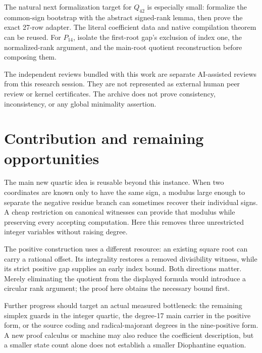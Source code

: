 \documentclass[11pt,a4paper]{article}
\theoremstyle{remark}\newtheorem{remark}[theorem]{Remark}
\begin{document}
The natural next formalization target for $Q_{42}$ is especially small:
formalize the common-sign bootstrap with the abstract signed-rank lemma,
then prove the exact 27-row adapter. The literal coefficient data and
native compilation theorem can be reused. For $P_{14}$, isolate the
first-root gap's exclusion of index one, the normalized-rank argument,
and the main-root quotient reconstruction before composing them.

The independent reviews bundled with this work are separate AI-assisted
reviews from this research session. They are not represented as external
human peer review or kernel certificates. The archive does not prove
consistency, inconsistency, or any global minimality assertion.

\section{Contribution and remaining opportunities}

The main new quartic idea is reusable beyond this instance. When two
coordinates are known only to have the same sign, a modulus large enough
to separate the negative residue branch can sometimes recover their
individual signs. A cheap restriction on canonical witnesses can provide
that modulus while preserving every accepting computation. Here this
removes three unrestricted integer variables without raising degree.

The positive construction uses a different resource: an existing square
root can carry a rational offset. Its integrality restores a removed
divisibility witness, while its strict positive gap supplies an early
index bound. Both directions matter. Merely eliminating the quotient
from the displayed formula would introduce a circular rank argument;
the proof here obtains the necessary bound first.

Further progress should target an actual measured bottleneck: the
remaining simplex guards in the integer quartic, the degree-17 main
carrier in the positive form, or the source coding and radical-majorant
degrees in the nine-positive form. A new proof calculus or machine may
also reduce the coefficient description, but a smaller state count alone
does not establish a smaller Diophantine equation.
\end{document}
